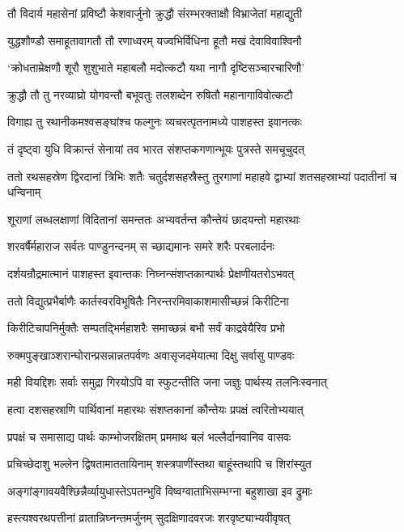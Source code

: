 \twolineshloka
{तौ विदार्य महासेनां प्रविष्टौ केशवार्जुनो}
{क्रुद्धौ संरम्भरक्ताक्षौ विभ्राजेतां महाद्युती}


\twolineshloka
{युद्धशौण्डौ समाहूतावागतौ तौ रणाध्वरम्}
{यज्वभिर्विधिना हूतौ मखं देवाविवाश्विनौ}


\twolineshloka
{`क्रोधताम्रेक्षणौ शूरौ शुशुभाते महाबलौ}
{मदोत्कटौ यथा नागौ दृष्टिसञ्चारचारिणौ'}


\twolineshloka
{क्रुद्धौ तौ तु नरव्याघ्रो योगवन्तौ बभूवतुः}
{तलशब्देन रुषितौ महानागाविवोत्कटौ}


\twolineshloka
{विगाह्य तु रथानीकमश्वसङ्घांश्च फल्गुनः}
{व्यचरत्पृतनामध्ये पाशहस्त इवानत्कः}


\twolineshloka
{तं दृष्ट्वा युधि विक्रान्तं सेनायां तव भारत}
{संशप्तकगणान्भूयः पुत्रस्ते समचूचुदत्}


\threelineshloka
{ततो रथसहस्रेण द्विरदानां त्रिभिः शतैः}
{चतुर्दशसहस्रैस्तु तुरगाणां महाहवे}
{द्वाभ्यां शतसहस्राभ्यां पदातीनां च धन्विनाम्}


\twolineshloka
{शूराणां लब्धलक्षाणां विदितानां समन्ततः}
{अभ्यवर्तन्त कौन्तेयं छादयन्तो महारथाः}


\twolineshloka
{शरवर्षैर्महाराज सर्वतः पाण्डुनन्दनम्}
{स च्छाद्यमानः समरे शरैः परबलार्दनः}


\twolineshloka
{दर्शयन्रौद्रमात्मानं पाशहस्त इवान्तकः}
{निघ्नन्संशप्तकान्पार्थः प्रेक्षणीयतरोऽभवत्}


\twolineshloka
{ततो विद्युत्प्रभैर्बाणैः कार्तस्वरविभूषितैः}
{निरन्तरमिवाकाशमासीच्छन्नं किरीटिना}


\twolineshloka
{किरीटिचापनिर्मुक्तैः सम्पतद्भिर्महाशरैः}
{समाच्छन्नं बभौ सर्वं काद्रवेयैरिव प्रभो}


\twolineshloka
{रुक्मपुङ्खाञ्शरान्घोरान्प्रसन्नान्नतपर्वणः}
{अवासृजदमेयात्मा दिक्षु सर्वासु पाण्डवः}


\twolineshloka
{मही वियद्दिशः सर्वाः समुद्रा गिरयोऽपि वा}
{स्फुटन्तीति जना जज्ञुः पार्थस्य तलनिःस्वनात्}


\twolineshloka
{हत्वा दशसहस्राणि पार्थिवानां महारथः}
{संशप्तकानां कौन्तेयः प्रपक्षं त्वरितोभ्ययात्}


\twolineshloka
{प्रपक्षं च समासाद्य पार्थः काम्भोजरक्षितम्}
{प्रममाथ बलं भल्लैर्दानवानिव वासवः}


\twolineshloka
{प्रचिच्छेदाशु भल्लेन द्विषतामाततायिनाम्}
{शस्त्रपाणींस्तथा बाहूंस्तथापि च शिरांस्युत}


\twolineshloka
{अङ्गांङ्गावयवैश्छिन्नैर्व्यायुधास्तेऽपतन्भुवि}
{विष्वग्वाताभिसम्भग्ना बहुशाखा इव द्रुमाः}


\twolineshloka
{हस्त्यश्वरथपत्तीनां व्रातान्निघ्नन्तमर्जुनम्}
{सुदक्षिणादवरजः शरवृष्ट्याभ्यवीवृषत्}


